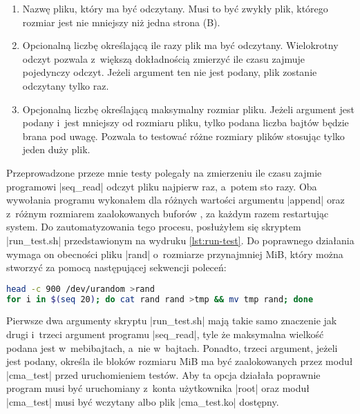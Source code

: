 \begin{enumerate}
\item Nazwę pliku, który ma być odczytany.  Musi to być zwykły plik,
  którego rozmiar jest nie mniejszy niż jedna strona (\unit[4096]{B}).
\item Opcionalną liczbę określającą ile razy plik ma być odczytany.
  Wielokrotny odczyt pozwala z~większą dokładnością zmierzyć ile czasu
  zajmuje pojedynczy odczyt.  Jeżeli argument ten nie jest podany,
  plik zostanie odczytany tylko raz.
\item Opcjonalną liczbę określającą maksymalny rozmiar pliku.  Jeżeli
  argument jest podany i~jest mniejszy od rozmiaru pliku, tylko podana
  liczba bajtów będzie brana pod uwagę.  Pozwala to testować różne
  rozmiary plików stosując tylko jeden duży plik.
\end{enumerate}



Przeprowadzone przeze mnie testy polegały na zmierzeniu ile czasu
zajmie programowi \code|seq_read| odczyt pliku najpierw raz, a~potem
sto razy.  Oba wywołania programu wykonałem dla różnych wartości
argumentu \code|append| oraz z~różnym rozmiarem zaalokowanych buforów
, za każdym razem restartując system.  Do zautomatyzowania
tego procesu, posłużyłem się skryptem \code|run_test.sh|
przedstawionym na wydruku \ref{lst:run-test}.  Do poprawnego działania
wymaga on obecności pliku \code|rand| o~rozmiarze przynajmniej
\unit[900]{MiB}, który można stworzyć za pomocą następującej sekwencji
poleceń:

\begin{lstlisting}[language=sh,numbers=none,columns=fullflexible]
head -c 900 /dev/urandom >rand
for i in $(seq 20); do cat rand rand >tmp && mv tmp rand; done
\end{lstlisting}

Pierwsze dwa argumenty skryptu \code|run_test.sh| mają takie samo
znaczenie jak drugi i~trzeci argument programu \code|seq_read|, tyle
że maksymalna wielkość podana jest w~mebibajtach, a~nie w~bajtach.
Ponadto, trzeci argument, jeżeli jest podany, określa ile bloków
rozmiaru \unit[128]{MiB} ma być zaalokowanych przez moduł
\code|cma_test| przed uruchomieniem testów.  Aby ta opcja działała
poprawnie program musi być uruchomiany z~konta użytkownika \code|root|
oraz moduł \code|cma_test| musi być wczytany albo plik
\code|cma_test.ko| dostępny.

